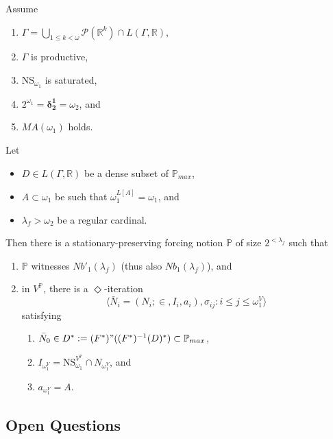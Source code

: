 \documentclass[12pt]{article}
\numberwithin{equation}{section}
\begin{document}
\begin{thm}
Assume
\begin{enumerate}[label=(\roman*), leftmargin=40pt]
    \item $\Gamma  = \bigcup_{1 \leq k < \omega} \mathcal{P}(\mathbb{R}^{k}) \cap L(\Gamma, \mathbb{R})$,
    \item $\Gamma$ is productive,
    \item $\mathrm{NS}_{\omega_1}$ is saturated,
    \item $2^{\omega_1} = \mathbf{\delta^1_2} = \omega_2$, and
    \item $MA(\omega_1)$ holds.
\end{enumerate}
Let 
\begin{itemize}
    \item $D \in L(\Gamma, \mathbb{R})$ be a dense subset of $\mathbb{P}_{max}$,
    \item $A \subset \omega_1$ be such that $\omega_1^{L[A]} = \omega_1$, and
    \item $\lambda_f > \omega_2$ be a regular cardinal.
\end{itemize}
Then there is a stationary-preserving forcing notion $\mathbb{P}$ of size $2^{< \lambda_f}$ such that 
\begin{enumerate}[label=(\alph*)]
    \item $\mathbb{P}$ witnesses $Nb'_1(\lambda_f)$ (thus also $Nb_1(\lambda_f)$), and
    \item in $V^{\mathbb{P}}$, there is a $\Diamond$-iteration $$\langle \bar{N}_i = (N_i; \in, I_i, a_i), \sigma_{ij} : i \leq j \leq \omega_1^V \rangle$$ satisfying 
    \begin{enumerate}[label=(\arabic*), leftmargin=40pt]
        \item $\bar{N}_0 \in D^* := (F^*) " ((F^*)^{-1}(D)^*) \subset \mathbb{P}_{max}$,
        \item $I_{\omega_1^V} = \mathrm{NS}_{\omega_1}^{V^{\mathbb{P}}} \cap N_{\omega_1^V}$, and
        \item $a_{\omega_1^V} = A$.
    \end{enumerate}
\end{enumerate}
\end{thm}

\subsection{Open Questions}
\end{document}
